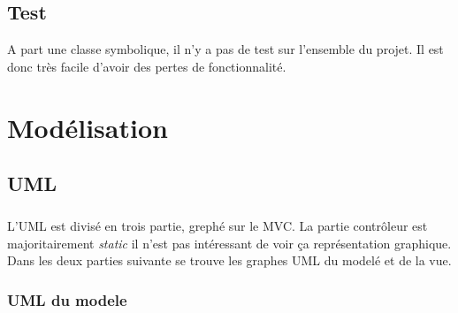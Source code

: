 \documentclass[a4paper,10pt]{report}
\begin{document}
	\section{Test}

		 A part une classe symbolique, il n'y a pas de test sur l’ensemble du projet. Il est donc très facile d'avoir des pertes de fonctionnalité.

\chapter{Modélisation}

	\section{UML}

		\paragraph*{}
		L'UML est divisé en trois partie, grephé sur le MVC. La partie contrôleur est majoritairement \textit{static} il n'est pas intéressant de voir ça représentation graphique. Dans les deux parties suivante se trouve les graphes UML du modelé et de la vue.

		\subsection{UML du modele}
\end{document}
